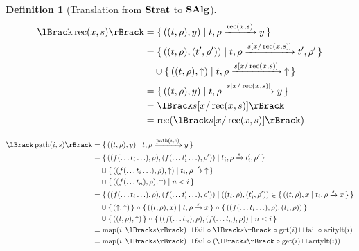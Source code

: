 \documentclass{article}
\newtheorem{definition}[theorem]{Definition}
\begin{document}
\begin{definition}[Translation from $\mathbf{Strat}$ to $\mathbf{SAlg}$]
\begin{align*}
  \sem{\fix{x}{s}}
    &= {\setbuild{((t,\rho),y)}{\transformx{t}{\rho}{\fix{x}{s}}{y}}} \\
    &= {\setbuild{((t,\rho),(t',\rho'))}{\transform{t}{\rho}{\subst{s}{x}{\fix{x}{s}}}{t'}{\rho'}}} \\
    &\quad \cup {\setbuild{((t,\rho),\fail)}{\transformfail{t}{\rho}{\subst{s}{x}{\fix{x}{s}}}}} \\
    &= {\setbuild{((t,\rho),y)}{\transformx{t}{\rho}{\subst{s}{x}{\fix{x}{s}}}{y}}} \\
    &= \sem{\subst{s}{x}{\fix{x}{s}}} \\
    &= \lfix(\sem{\subst{s}{x}{\fix{x}{s}}})
\end{align*}

\begin{align*}
  \sem{\path{i}{s}}
    &= \setbuild{((t,\rho),y)}{\transformx{t}{\rho}{\path{i}{s}}{y}} \\
    &= \setbuild{((f(\ldots t_i \ldots),\rho),(f(\ldots t_i' \ldots),\rho'))}{\transform{t_i}{\rho}{s}{t_i'}{\rho'}} \\
    &\quad \cup {\setbuild{((f(\ldots t_i \ldots),\rho),\fail)}{\transformfail{t_i}{\rho}{s}}} \\
    &\quad \cup {\setbuild{((f(\ldots t_n),\rho),\fail)}{ n < i }} \\
    &= \setbuild{ ((f(\ldots t_i \ldots),\rho),(f(\ldots t_i' \ldots),\rho')) }{ ((t_i,\rho),(t_i',\rho')) \in \setbuild{ ((t,\rho),x }{ \transformx{t_i}{\rho}{s}{x} } } \\
    &\quad \cup \setbuildc{ (\fail,\fail)} \comp {\setbuild{((t,\rho),x)}{\transformx{t}{\rho}{s}{x}}} \comp {\setbuildc{((f(\ldots t_i \ldots),\rho),(t_i,\rho))}} \\
    &\quad \cup \setbuildc{((t,\rho),\fail)} \comp \setbuild{((f(\ldots t_n),\rho),(f(\ldots t_n),\rho))}{ n < i } \\
    &= \map(i,\sem{s}) \sqcup \lfail \comp \sem{s} \comp \get(i) \sqcup \lfail \comp \aritylt(i) \\
    &= \map(i,\sem{s}) \sqcup \lfail \comp (\sem{s} \comp \get(i) \sqcup \aritylt(i))
\end{align*}


\end{definition}
\end{document}
